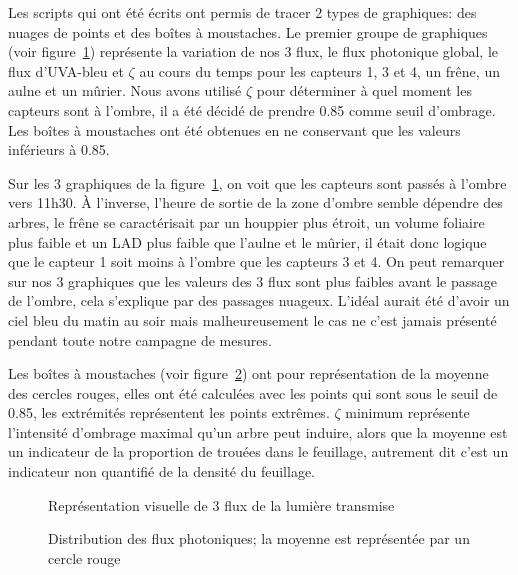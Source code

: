 \documentclass[12pt]{report}
\begin{document}
Les scripts qui ont été écrits ont permis de tracer 2 types de graphiques: des
nuages de points et des boîtes à moustaches. Le premier groupe de graphiques
(voir figure~\ref{fig:flux}) représente la variation de nos 3 flux, le flux
photonique global, le flux d'UVA-bleu et $\zeta$ au cours du temps pour les capteurs
1, 3 et 4, un frêne, un aulne et un mûrier. Nous avons utilisé $\zeta$ pour
déterminer à quel moment les capteurs sont à l'ombre, il a été décidé de prendre
0.85 comme seuil d'ombrage. Les boîtes à moustaches ont été obtenues en ne
conservant que les valeurs inférieurs à 0.85.

Sur les 3 graphiques de la figure~\ref{fig:flux}, on voit que les capteurs sont
passés à l'ombre vers 11h30. À l'inverse, l'heure de sortie de la zone d'ombre
semble dépendre des arbres, le frêne se caractérisait par un houppier plus
étroit, un volume foliaire plus faible et un LAD plus faible que l'aulne et le
mûrier, il était donc logique que le capteur 1 soit moins à l'ombre que les
capteurs 3 et 4. On peut remarquer sur nos 3 graphiques que les valeurs des 3
flux sont plus faibles avant le passage de l'ombre, cela s'explique par des
passages nuageux. L'idéal aurait été d'avoir un ciel bleu du matin au soir mais
malheureusement le cas ne c'est jamais présenté pendant toute notre campagne de
mesures.

Les boîtes à moustaches (voir figure~\ref{fig:boxplots}) ont pour représentation de la
moyenne des cercles rouges, elles ont été calculées avec les points qui sont
sous le seuil de 0.85, les extrémités représentent les points extrêmes. $\zeta$
minimum représente l'intensité d'ombrage maximal qu'un arbre peut induire, alors
que la moyenne est un indicateur de la proportion de trouées dans le feuillage,
autrement dit c'est un indicateur non quantifié de la densité du feuillage.

\begin{figure}[h]
  \centering
  \begin{tiny}
    
  \end{tiny}
  \caption{Représentation visuelle de 3 flux de la lumière transmise\label{fig:flux}}
\end{figure}

\begin{figure}[h]
  \centering
  \begin{small}
    
  \end{small}
  \caption{Distribution des flux photoniques; la moyenne est représentée par un
    cercle rouge\label{fig:boxplots}}
\end{figure}
\end{document}
